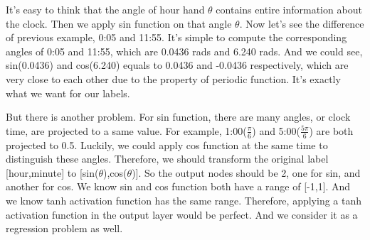 \documentclass{article}
\begin{document}
It's easy to think that the angle of hour hand $\theta$ contains entire information about the clock. Then we apply sin function on that angle $\theta$. Now let's see the difference of previous example, 0:05 and 11:55. It's simple to compute the corresponding angles of 0:05 and 11:55, which are 0.0436 rads and 6.240 rads. And we could see, sin(0.0436) and cos(6.240) equals to 0.0436 and -0.0436 respectively, which are very close to each other due to the property of periodic function. It's exactly what we want for our labels.

But there is another problem. For sin function, there are many angles, or clock time, are projected to a same value. For example, 1:00($\frac{\pi}{6}$) and 5:00($\frac{5\pi}{6}$) are both projected to 0.5. Luckily, we could apply cos function at the same time to distinguish these angles. Therefore, we should transform the original label [hour,minute] to [sin($\theta$),cos($\theta$)]. So the output nodes should be 2, one for sin, and another for cos. We know sin and cos function both have a range of [-1,1]. And we know tanh activation function has the same range. Therefore, applying a tanh activation function in the output layer would be perfect. And we consider it as a regression problem as well.
\end{document}
